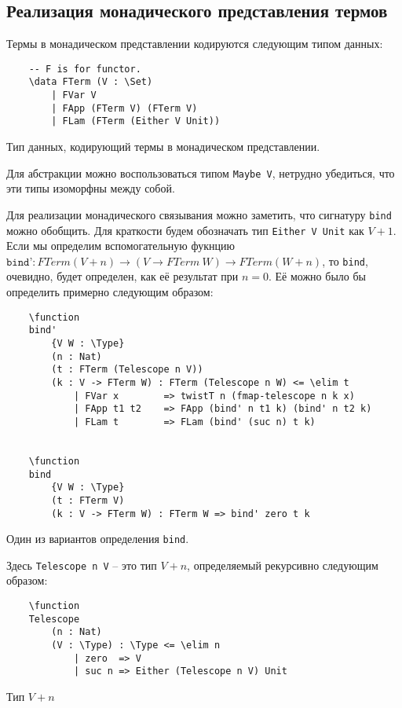 \subsection{Реализация монадического представления термов}

Термы в монадическом представлении кодируются следующим типом данных:

\begin{listing}[H]
  \begin{verbatim}
    -- F is for functor.
    \data FTerm (V : \Set)
        | FVar V
        | FApp (FTerm V) (FTerm V)
        | FLam (FTerm (Either V Unit))
  \end{verbatim}
  \caption{Тип данных, кодирующий термы в монадическом представлении.}
\end{listing}

Для абстракции можно воспользоваться типом \texttt{Maybe V}, нетрудно убедиться, что эти типы изоморфны между собой.

Для реализации монадического связывания можно заметить, что сигнатуру \texttt{bind} можно обобщить. Для краткости будем обозначать тип \texttt{Either V Unit} как $V + 1$. Если мы определим вспомогательную фукнцию $\texttt{bind'} : FTerm (V + n) \to (V \to FTerm\ W) \to FTerm (W + n) $, то \texttt{bind}, очевидно, будет определен, как её результат при $n = 0$. Её можно было бы определить примерно следующим образом:

\begin{listing}[H]
  \begin{verbatim}
    \function
    bind'
        {V W : \Type}
        (n : Nat)
        (t : FTerm (Telescope n V))
        (k : V -> FTerm W) : FTerm (Telescope n W) <= \elim t
            | FVar x        => twistT n (fmap-telescope n k x)
            | FApp t1 t2    => FApp (bind' n t1 k) (bind' n t2 k)
            | FLam t        => FLam (bind' (suc n) t k)


    \function
    bind
        {V W : \Type}
        (t : FTerm V)
        (k : V -> FTerm W) : FTerm W => bind' zero t k
  \end{verbatim}
  \caption{Один из вариантов определения \texttt{bind}.}
\end{listing}

Здесь \texttt{Telescope n V} -- это тип $V + n$, определяемый рекурсивно следующим образом:

\begin{listing}[H]
  \begin{verbatim}
    \function
    Telescope
        (n : Nat)
        (V : \Type) : \Type <= \elim n
            | zero  => V
            | suc n => Either (Telescope n V) Unit
  \end{verbatim}
  \caption{Тип $V + n$}
\end{listing}

